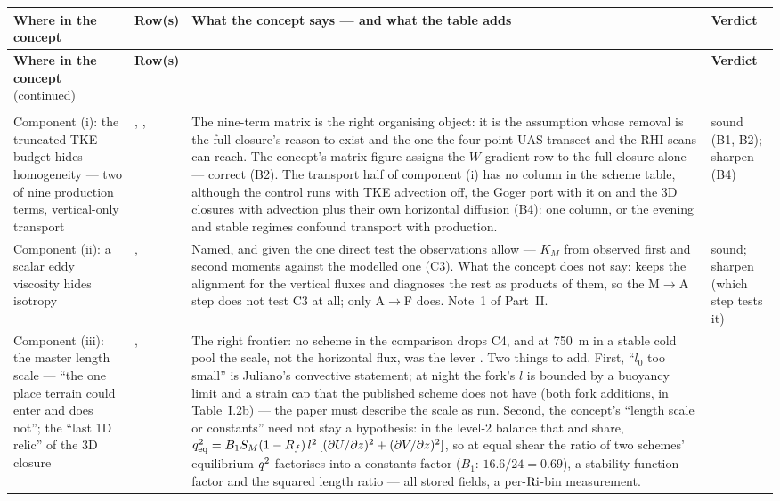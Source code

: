 \begin{center}
\footnotesize
\setlength{\tabcolsep}{4pt}
\renewcommand{\arraystretch}{1.12}
\begin{xltabular}{\linewidth}{@{}>{\raggedright\arraybackslash}p{3.3cm}
  >{\raggedright\arraybackslash}p{1.4cm}
  >{\raggedright\arraybackslash}X
  >{\raggedright\arraybackslash}p{1.6cm}@{}}
\toprule
\textbf{Where in the concept} & \textbf{Row(s)} & \textbf{What the concept says --- and what the table adds} & \textbf{Verdict} \\
\midrule
\endfirsthead
\toprule
\textbf{Where in the concept} (continued) & \textbf{Row(s)} & & \textbf{Verdict} \\
\midrule
\endhead
\bottomrule
\endlastfoot
{} \\
\addlinespace[2pt]
Component (i): the truncated TKE budget hides homogeneity --- two of nine production terms, vertical-only transport &
, ,  &
The nine-term matrix is the right organising object: it is the assumption whose removal is the full closure's reason to exist and the one the four-point UAS transect and the RHI scans can reach. The concept's matrix figure assigns the $W$-gradient row to the full closure alone --- correct (B2). The transport half of component (i) has no column in the scheme table, although the control runs with TKE advection off, the Goger port with it on and the 3D closures with advection plus their own horizontal diffusion (B4): one column, or the evening and stable regimes confound transport with production. &
sound (B1, B2); sharpen (B4) \\
\addlinespace[3pt]
Component (ii): a scalar eddy viscosity hides isotropy &
,  &
Named, and given the one direct test the observations allow --- $K_M$ from observed first and second moments against the modelled one (C3). What the concept does not say: \schemeA{} keeps the alignment for the vertical fluxes and diagnoses the rest as products of them, so the M$\to$A step does not test C3 at all; only A$\to$F does. Note~1 of Part~II. &
sound; sharpen (which step tests it) \\
\addlinespace[3pt]
Component (iii): the master length scale --- ``the one place terrain could enter and does not''; the ``last 1D relic'' of the 3D closure &
,  &
The right frontier: no scheme in the comparison drops C4, and at 750~m in a stable cold pool the scale, not the horizontal flux, was the lever \parencite{arthur2022}. Two things to add. First, ``$l_0$ too small'' is Juliano's convective statement; at night the fork's $l$ is bounded by a buoyancy limit and a strain cap that the published scheme does not have (both fork additions, \fork{} in Table~I.2b) --- the paper must describe the scale as run. Second, the concept's ``length scale or constants'' need not stay a hypothesis: in the level-2 balance that \schemeM{} and \schemeA{} share, $q^{2}_{\mathrm{eq}} = B_1 S_M (1 - R_f)\, l^2\, [(\partial U/\partial z)^2 + (\partial V/\partial z)^2]$, so at equal shear the ratio of two schemes' equilibrium $q^{2}$ factorises into a constants factor ($B_1$: $16.6/24 = 0.69$), a stability-function factor and the squared length ratio --- all stored fields, a per-$\mathrm{Ri}$-bin measurement. &

\end{xltabular}
\end{center}
